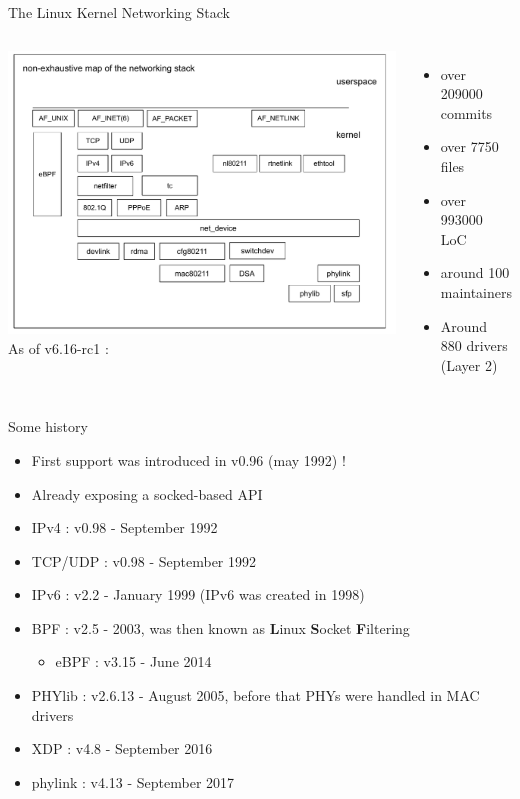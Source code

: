 \begin{frame}{The Linux Kernel Networking Stack}
	\begin{columns}
		\includegraphics[width=\textwidth]{slides/networking-stack-overview/stackmap.pdf}
		As of v6.16-rc1 :
		\begin{itemize}
			\item over 209000 commits
			\item over 7750 files
			\item over 993000 LoC
			\item around 100 maintainers
			\item Around 880 drivers (Layer 2)
		\end{itemize}
	\end{columns}
\end{frame}

\begin{frame}{Some history}
	\begin{itemize}
		\item First support was introduced in v0.96 (may 1992) !
		\item Already exposing a socked-based API
		\item IPv4 : v0.98 - September 1992
		\item TCP/UDP : v0.98 - September 1992
		\item IPv6 : v2.2 - January 1999 (IPv6 was created in 1998)
		\item BPF : v2.5 - 2003, was then known as \textbf{L}inux \textbf{S}ocket \textbf{F}iltering
			\begin{itemize}
				\item eBPF : v3.15 - June 2014
			\end{itemize}
		\item PHYlib : v2.6.13 - August 2005, before that PHYs were handled in MAC drivers
		\item XDP : v4.8 - September 2016
		\item phylink : v4.13 - September 2017
	\end{itemize}
\end{frame}

